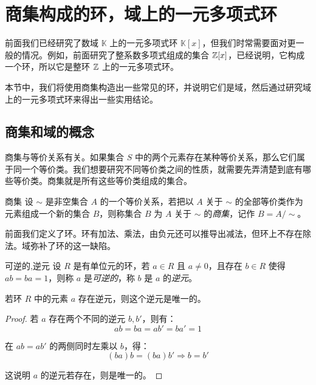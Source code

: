 
\section{商集构成的环，域上的一元多项式环}

前面我们已经研究了数域 $\mathbb K$ 上的一元多项式环 $\mathbb K[x]$，但我们时常需要面对更一般的情况。例如，前面研究了整系数多项式组成的集合 $\mathbb Z[x]$，已经说明，它构成一个环，所以它是整环 $\mathbb Z$ 上的一元多项式环。

本节中，我们将使用商集构造出一些常见的环，并说明它们是域，然后通过研究域上的一元多项式环来得出一些实用结论。

\subsection{商集和域的概念}

商集与等价关系有关。如果集合 $S$ 中的两个元素存在某种等价关系，那么它们属于同一个等价类。我们想要研究不同等价类之间的性质，就需要先弄清楚到底有哪些等价类。商集就是所有这些等价类组成的集合。

\begin{definition}{商集}
	设 $\sim$ 是非空集合 $A$ 的一个等价关系，若把以 $A$ 关于 $\sim$ 的全部等价类作为元素组成一个新的集合 $B$，则称集合 $B$ 为 $A$ 关于 $\sim$ 的\emph{商集}，记作 $B = A / {\sim}$。
\end{definition}

\bigskip

前面我们定义了环。环有加法、乘法，由负元还可以推导出减法，但环上不存在除法。域弥补了环的这一缺陷。

\begin{definition}{可逆的,逆元}
	设 $R$ 是有单位元的环，若 $a \in R$ 且 $a \ne 0$，且存在 $b \in R$ 使得 $ab = ba = 1$，则称 $a$ 是\emph{可逆的}，称 $b$ 是 $a$ 的\emph{逆元}。
\end{definition}

\begin{proposition}
	若环 $R$ 中的元素 $a$ 存在逆元，则这个逆元是唯一的。
\end{proposition}

\begin{proof}
	若 $a$ 存在两个不同的逆元 $b, b'$，则有：
	$$
	ab = ba = ab' = ba' = 1
	$$

	在 $ab = ab'$ 的两侧同时左乘以 $b$，得：
	$$
	(ba) b = (ba) b' \Longrightarrow b = b'
	$$

	这说明 $a$ 的逆元若存在，则是唯一的。
\end{proof}

